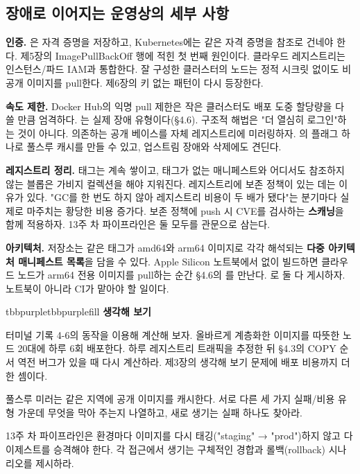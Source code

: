 \subsection*{장애로 이어지는 운영상의 세부 사항}

\begin{tbbitemize}
  \item \textbf{인증.} 은 자격 증명을 저장하고, Kubernetes에는 같은 자격 증명을  참조로 건네야 한다. 제5장의 ImagePullBackOff 행에 적힌 첫 번째 원인이다. 클라우드 레지스트리는 인스턴스/파드 IAM과 통합한다. 잘 구성한 클러스터의 노드는 정적 시크릿 없이도 비공개 이미지를 pull한다. 제6장의 키 없는 패턴이 다시 등장한다.
  \item \textbf{속도 제한.} Docker Hub의 익명 pull 제한은 작은 클러스터도 배포 도중 할당량을 다 쓸 만큼 엄격하다. 는 실제 장애 유형이다(§4.6). 구조적 해법은 "더 열심히 로그인"하는 것이 아니다. 의존하는 공개 베이스를 자체 레지스트리에 미러링하자. 의 플래그 하나로 풀스루 캐시를 만들 수 있고, 업스트림 장애와 삭제에도 견딘다.
  \item \textbf{레지스트리 정리.} 태그는 계속 쌓이고, 태그가 없는 매니페스트와 어디서도 참조하지 않는 블롭은 가비지 컬렉션을 해야 지워진다. 레지스트리에 보존 정책이 있는 데는 이유가 있다. "GC를 한 번도 하지 않아 레지스트리 비용이 두 배가 됐다"는 분기마다 실제로 마주치는 황당한 비용 증가다. 보존 정책에 push 시 CVE를 검사하는 \textbf{스캐닝}을 함께 적용하자. 13주 차 파이프라인은 둘 모두를 관문으로 삼는다.
  \item \textbf{아키텍처.} 저장소는 같은 태그가 amd64와 arm64 이미지로 각각 해석되는 \textbf{다중 아키텍처 매니페스트 목록}을 담을 수 있다. Apple Silicon 노트북에서  없이 빌드하면 클라우드 노드가 arm64 전용 이미지를 pull하는 순간 §4.6의 를 만난다. 로 둘 다 게시하자. 노트북이 아니라 CI가 맡아야 할 일이다.
\end{tbbitemize}

\begin{calloutbox}{tbbpurple}{tbbpurplefill}
{\normalsize\bfseries\color{tbbpurple}생각해 보기}\par\vspace{3pt}
\begin{tbbitemize}
  \item 터미널 기록 4-6의 동작을 이용해 계산해 보자. 올바르게 계층화한 이미지를 따뜻한 노드 20대에 하루 6회 배포한다. 하루 레지스트리 트래픽을 추정한 뒤 §4.3의 COPY 순서 역전 버그가 있을 때 다시 계산하라. 제3장의 생각해 보기 문제에 배포 비용까지 더한 셈이다.
  \item 풀스루 미러는 같은 지역에 공개 이미지를 캐시한다. 서로 다른 세 가지 실패/비용 유형 가운데 무엇을 막아 주는지 나열하고, 새로 생기는 실패 하나도 찾아라.
  \item 13주 차 파이프라인은 환경마다 이미지를 다시 태깅("staging" → "prod")하지 않고 다이제스트를 승격해야 한다. 각 접근에서 생기는 구체적인 경합과 롤백(rollback) 시나리오를 제시하라.
\end{tbbitemize}
\end{calloutbox}

